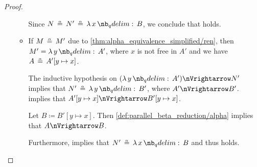 \begin{proof}
\begin{itemize}
\begin{itemize}
      Since \( N \aequiv N' \aequiv \qabs x B \), we conclude that  holds.

      \item If \( M \aequiv M' \) due to \ref{thm:alpha_equivalence_simplified/ren}, then \( M' = \qabs y A' \), where \( x \) is not free in \( A' \) and we have \( A \aequiv A'[y \mapsto x] \).

      The inductive hypothesis on \( (\qabs y A') \pred N' \) implies that \( N' \aequiv \qabs y B' \), where \( A' \pred B' \).  implies that \( A'[y \mapsto x] \pred B'[y \mapsto x] \).

      Let \( B \coloneqq B'[y \mapsto x] \). Then \ref{def:parallel_beta_reduction/alpha} implies that \( A \pred B \).

      Furthermore,  implies that \( N' \aequiv \qabs x B \) and thus  holds.
    \end{itemize}
  \end{itemize}
\end{proof}

